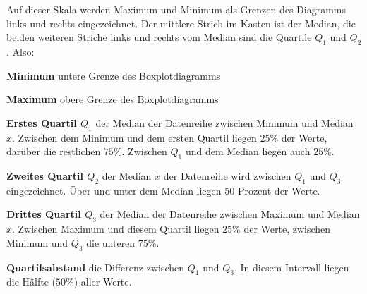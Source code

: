 Auf dieser Skala werden Maximum und Minimum als Grenzen des Diagramms links und rechts eingezeichnet. Der mittlere Strich im Kasten ist der Median, die beiden weiteren Striche links und rechts vom Median sind die Quartile $Q_{1}$ und $Q_{2}$. Also:

\textbf{Minimum}  untere Grenze des Boxplotdiagramms

\textbf{Maximum}  obere Grenze des Boxplotdiagramms

\textbf{Erstes Quartil $Q_{1}$}  der Median der Datenreihe zwischen Minimum und Median $\tilde{x}$. Zwischen dem Minimum und dem ersten Quartil liegen $25\%$ der Werte, dar\"{u}ber die restlichen $75\%$. Zwischen $Q_{1}$ und dem Median liegen auch $25\%$.

\textbf{Zweites Quartil $Q_{2}$}  der Median $\tilde{x}$ der Datenreihe wird zwischen $Q_{1}$ und $Q_{3}$ eingezeichnet. \"{U}ber und unter dem Median liegen 50 Prozent der Werte.

\textbf{Drittes Quartil $Q_{3}$}  der Median der Datenreihe zwischen Maximum und Median $\tilde{x}$. Zwischen Maximum und diesem Quartil liegen $25\%$ der Werte, zwischen Minimum und $Q_{3}$ die unteren $75\%$.

\textbf{Quartilsabstand}  die Differenz zwischen $Q_{1}$ und $Q_{3}$. In diesem Intervall liegen die H\"{a}lfte ($50 \%$) aller Werte.



